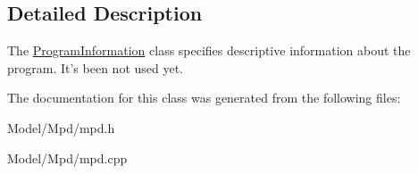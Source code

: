 \subsection{Detailed Description}
The \hyperlink{class_program_information}{Program\-Information} class specifies descriptive information about the program. It's been not used yet. 

The documentation for this class was generated from the following files\-:\begin{DoxyCompactItemize}
\item 
Model/\-Mpd/mpd.\-h\item 
Model/\-Mpd/mpd.\-cpp\end{DoxyCompactItemize}
